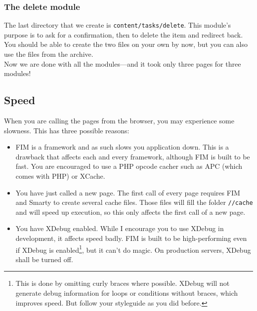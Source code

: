\documentclass{scrartcl}
\begin{document}
   \subsubsection{The delete module}
      The last directory that we create is \texttt{content/tasks/delete}. This module's purpose is to ask for a confirmation, then to delete the item and redirect back. You should be able to create the two files on your own by now, but you can also use the files from the archive. \\

      Now we are done with all the modules---and it took only three pages for three modules!
   \subsection{Speed}
      When you are calling the pages from the browser, you may experience some slowness. This has three possible reasons:
      \begin{itemize}
         \item
            FIM is a framework and as such slows you application down. This is a drawback that affects each and every framework, although FIM is built to be fast. You are encouraged to use a PHP opcode cacher such as APC (which comes with PHP) or XCache.
         \item
            You have just called a new page. The first call of every page requires FIM and Smarty to create several cache files. Those files will fill the folder \texttt{//cache} and will speed up execution, so this only affects the first call of a new page.
         \item
            You have XDebug enabled. While I encourage you to use XDebug in development, it affects speed badly. FIM is built to be high-performing even if XDebug is enabled\footnote{This is done by omitting curly braces where possible. XDebug will not generate debug information for loops or conditions without braces, which improves speed. But follow your styleguide as you did before.}, but it can't do magic. On production servers, XDebug shall be turned off.
      \end{itemize}
\end{document}
